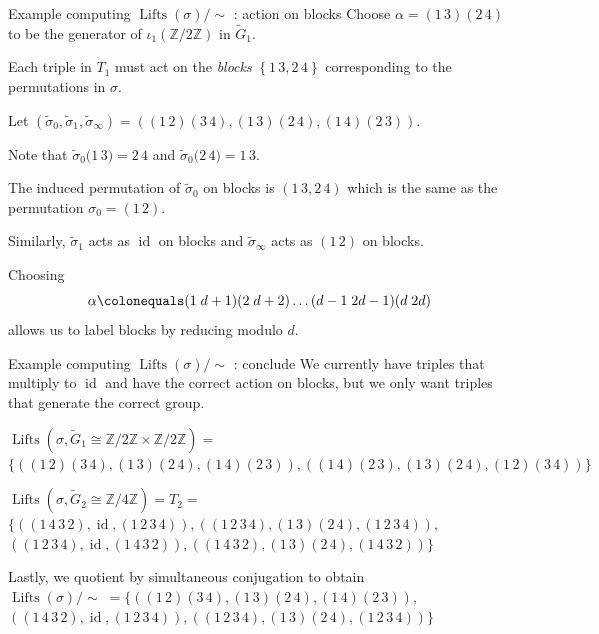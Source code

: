 \documentclass[xcolor=dvipsnames]{beamer}
\theoremstyle{plain}
\newcommand{\ZZ}{\mathbb Z}
\newcommand{\wt}[1]{\widetilde{#1}}
\DeclareMathOperator{\Lifts}{Lifts}
\DeclareMathOperator{\id}{id}
\begin{document}
  \begin{frame}{Example computing $\Lifts(\sigma)/\!\!\sim$ : action on blocks}
    Choose $\alpha=(1\,3)(2\,4)$ to be
    the generator of $\iota_1(\ZZ/2\ZZ)$
    in $\wt{G}_1$.
    \par
    Each triple in
    $T_1$ must act on the
    \emph{blocks}
    $\left\{\boxed{1\,3},\boxed{2\,4}\right\}$
    corresponding to the permutations in
    $\sigma$.
    \par
    Let
    $(\wt{\sigma}_0,\wt{\sigma}_1,\wt{\sigma}_\infty)=
    ((1\,2)(3\,4), (1\,3)(2\,4), (1\,4)(2\,3))$.
    \par
    Note that
    $\wt{\sigma}_0\Big(\boxed{1\,3}\Big) = \boxed{2\,4}$
    and
    $\wt{\sigma}_0\Big(\boxed{2\,4}\Big) = \boxed{1\,3}$.
    \par
    The induced permutation
    of $\wt{\sigma}_0$ on blocks is
    $\left(\boxed{1\,3},\boxed{2\,4}\right)$
    which is the same as the
    permutation $\sigma_0 = (1\,2)$.
    \par
    Similarly,
    $\wt{\sigma}_1$ acts as $\id$ on blocks
    and $\wt{\sigma}_\infty$ acts
    as $(1\,2)$ on blocks.
    \par
    Choosing
    \[
      \alpha\colonequals
      (1\;d+1)(2\;d+2)\dots
      (d-1\;2d-1)(d\;2d)
    \]
    allows us to label blocks by reducing modulo $d$.
  \end{frame}
  \begin{frame}{Example computing $\Lifts(\sigma)/\!\!\sim$ : conclude}
    We currently have triples that multiply to $\id$
    and have the correct action on blocks,
    but we only want triples that
    generate the correct group.
    \par
    $\Lifts(\sigma,\wt{G}_1\cong\ZZ/2\ZZ\times\ZZ/2\ZZ)=$
    $\Big\{ ((1\,2)(3\,4), (1\,3)(2\,4), (1\,4)(2\,3)),
    ((1\,4)(2\,3), (1\,3)(2\,4), (1\,2)(3\,4)) \Big\}$
    \par
    $\Lifts(\sigma,\wt{G}_2\cong\ZZ/4\ZZ)=T_2=$
    $\Big\{ ((1\,4\,3\,2), \id, (1\,2\,3\,4)),
    ((1\,2\,3\,4), (1\,3)(2\,4), (1\,2\,3\,4)),$
    $((1\,2\,3\,4), \id, (1\,4\,3\,2)),
    ((1\,4\,3\,2), (1\,3)(2\,4), (1\,4\,3\,2)) \Big\}$
    \par
    Lastly, we quotient by simultaneous conjugation to obtain
    $\Lifts(\sigma)/\!\!\sim \;=\Big\{
    ((1\,2)(3\,4),(1\,3)(2\,4),(1\,4)(2\,3)),$
    $((1\,4\,3\,2),\id,(1\,2\,3\,4)),
    ((1\,2\,3\,4),(1\,3)(2\,4),(1\,2\,3\,4)) \Big\}$
  \end{frame}
\end{document}
